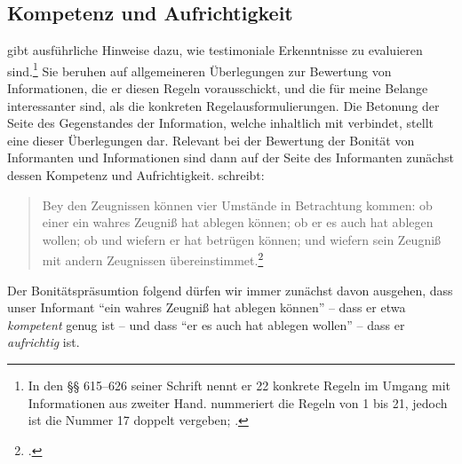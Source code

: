 \subsection{Kompetenz und
Aufrichtigkeit}\label{subsubsection:GeorgFriedrichMeier}
 gibt ausführliche Hinweise
dazu, wie testimoniale Erkenntnisse zu evaluieren sind.\footnote{In den {\S\S}
615--626 seiner Schrift  nennt er 22 konkrete Regeln im Umgang mit
Informationen aus zweiter Hand.  nummeriert die Regeln von 1 bis 21, jedoch ist die Nummer 17 doppelt vergeben;
\cite[vgl.][\S\S~623\,f.]{Crusius:WegzurGewissheitundZuverlaessigkeitdermenschlichenErkenntniss1965}.}
Sie beruhen auf allgemeineren Überlegungen zur Bewertung von Informationen, die
er diesen Regeln vorausschickt, und die für meine Belange interessanter sind, als
die konkreten Regelausformulierungen. Die Betonung der Seite des Gegenstandes
der Information, welche 
inhaltlich mit  verbindet, stellt  eine dieser Überlegungen
dar. Relevant bei der Bewertung der
Bonität von Informanten und Informationen sind dann auf der Seite des
Informanten zunächst dessen Kompetenz und Aufrichtigkeit.
 schreibt:
\begin{quote}
  Bey den Zeugnissen können vier Umstände in Betrachtung kommen: ob
  einer ein wahres Zeugniß hat ablegen können; ob er es auch hat ablegen wollen;
  ob und wiefern er hat betrügen können; und wiefern sein Zeugniß mit andern
  Zeugnissen übereinstimmet.\footnote{\Cite[][\S~611]{Crusius:WegzurGewissheitundZuverlaessigkeitdermenschlichenErkenntniss1965}.}
\end{quote}
Der Bonitätspräsumtion folgend dürfen wir immer zunächst davon ausgehen, dass
unser Informant \enquote{ein wahres Zeugniß hat ablegen können} -- dass er etwa
\emph{kompetent} genug ist -- und dass \enquote{er es auch hat ablegen wollen} -- dass
er \emph{aufrichtig} ist.

